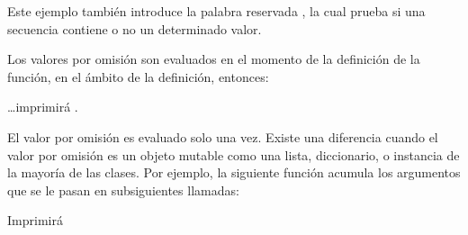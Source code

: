 \documentclass[a4,10pt,spanish]{sphinxmanual}
\begin{document}
\sphinxAtStartPar
Este ejemplo también introduce la palabra reservada , la cual prueba si una secuencia contiene o no un determinado valor.

\sphinxAtStartPar
Los valores por omisión son evaluados en el momento de la definición de la función, en el ámbito de la definición, entonces:

\begin{sphinxVerbatim}[commandchars=\\\{\}]
  

 

  
\end{sphinxVerbatim}

\sphinxAtStartPar
…imprimirá .

\sphinxAtStartPar
{} El valor por omisión es evaluado solo una vez. Existe una diferencia cuando el valor por omisión es un objeto mutable como una lista, diccionario, o instancia de la mayoría de las clases. Por ejemplo, la siguiente función acumula los argumentos que se le pasan en subsiguientes llamadas:

\begin{sphinxVerbatim}[commandchars=\\\{\}]
  \PYG{p}{[}\PYG{p}{]}
     

\end{sphinxVerbatim}

\sphinxAtStartPar
Imprimirá

\begin{sphinxVerbatim}[commandchars=\\\{\}]
\PYG{p}{[}\PYG{p}{]}
\PYG{p}{[} \PYG{p}{]}
\PYG{p}{[}  \PYG{p}{]}
\end{sphinxVerbatim}
\end{document}
